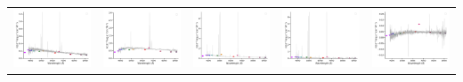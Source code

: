 \begin{center}
\begin{longtable}{l l l l l }
    \includegraphics[width=0.2\linewidth, clip]{Figs/Figs-sdss/spec-0391-51782-0625-STRIPE82-0014-009267.pdf} & \includegraphics[width=0.2\linewidth, clip]{Figs/Figs-sdss/spec-0392-51793-0583-STRIPE82-0016-049657.pdf} & \includegraphics[width=0.2\linewidth, clip]{Figs/Figs-sdss/spec-0287-52023-0466-SPLUS-n01s25-028549.pdf} & \includegraphics[width=0.2\linewidth, clip]{Figs/Figs-sdss/spec-0330-52370-0439-SPLUS-n03s21-047308.pdf} & \includegraphics[width=0.2\linewidth, clip]{Figs/Figs-sdss/spec-0376-52143-0086-STRIPE82-0139-018589.pdf} \\

\end{longtable}
\end{center}
